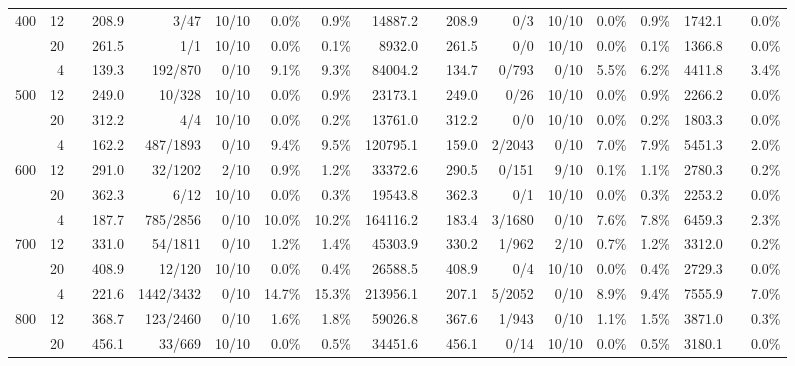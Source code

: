 \documentclass[11pt,a4paper]{article}
\newcommand{\ccg}{\cellcolor{lightgray}}
\begin{document}
\begin{sidewaystable}
{\begin{tabular}{rr r rrrrr r rrrrrrrrr}
400  & 12 &&  \ccg208.9 & 3/47	  &    10/10  & 0.0\%  & 0.9\%  & 14887.2    &&	  \ccg208.9 & 0/3  	 & 10/10 &  0.0\%  & 0.9\%  & 1742.1 && 0.0\% \\
     & 20 &&  \ccg261.5 & 1/1	  &    10/10  & 0.0\%  & 0.1\%  & 8932.0     &&	  \ccg261.5 & 0/0  	 & 10/10 &  0.0\%  & 0.1\%  & 1366.8 && 0.0\% \\ \hline
     & 4  &&  139.3 & 192/870	  &    0/10   & 9.1\%  & 9.3\%  & 84004.2    &&	  \ccg134.7 & 0/793	 & 0/10  &  5.5\%  & 6.2\%  & 4411.8 && 3.4\% \\
500  & 12 &&  \ccg249.0 & 10/328  &   10/10   & 0.0\%  & 0.9\%  & 23173.1    &&	  \ccg249.0 & 0/26 	 & 10/10 &  0.0\%  & 0.9\%  & 2266.2 && 0.0\% \\
     & 20 &&  \ccg312.2 & 4/4	  &    10/10  & 0.0\%  & 0.2\%  & 13761.0    &&	  \ccg312.2 & 0/0  	 & 10/10 &  0.0\%  & 0.2\%  & 1803.3 && 0.0\% \\ \hline
     & 4  &&  162.2 & 487/1893	  &    0/10   & 9.4\%  & 9.5\%  & 120795.1   &&	  \ccg159.0 & 2/2043	 & 0/10  &  7.0\%  & 7.9\%  & 5451.3 && 2.0\% \\
600  & 12 &&  291.0 & 32/1202	  &    2/10   & 0.9\%  & 1.2\%  & 33372.6    &&	  \ccg290.5 & 0/151	 & 9/10  &  0.1\%  & 1.1\%  & 2780.3 && 0.2\% \\
     & 20 &&  \ccg362.3 & 6/12	  &    10/10  & 0.0\%  & 0.3\%  & 19543.8    &&	  \ccg362.3 & 0/1  	 & 10/10 &  0.0\%  & 0.3\%  & 2253.2 && 0.0\% \\ \hline
     & 4  &&  187.7 & 785/2856    &    0/10   & 10.0\% & 10.2\% & 164116.2   &&	  \ccg183.4 & 3/1680	 & 0/10  &  7.6\%  & 7.8\%  & 6459.3 && 2.3\% \\
700  & 12 &&  331.0 & 54/1811	  &    0/10   & 1.2\%  & 1.4\%  & 45303.9    &&	  \ccg330.2 & 1/962	 & 2/10  &  0.7\%  & 1.2\%  & 3312.0 && 0.2\% \\
     & 20 &&  \ccg408.9 & 12/120  &    10/10  & 0.0\%  & 0.4\%  & 26588.5    &&	 \ccg408.9  & 0/4        & 10/10 &  0.0\%  & 0.4\%  & 2729.3 && 0.0\% \\ \hline
     & 4  &&  221.6 & 1442/3432   &    0/10   & 14.7\% & 15.3\% & 213956.1   &&	  \ccg207.1 & 5/2052	 & 0/10  &  8.9\%  & 9.4\%  & 7555.9 && 7.0\% \\
800  & 12 &&  368.7 & 123/2460	  &    0/10   & 1.6\%  & 1.8\%  & 59026.8    &&	  \ccg367.6 & 1/943	 & 0/10  &  1.1\%  & 1.5\%  & 3871.0 && 0.3\% \\
     & 20 &&  \ccg456.1 & 33/669  &    10/10  & 0.0\%  & 0.5\%  & 34451.6    &&	\ccg456.1   & 0/14       & 10/10 &  0.0\%  & 0.5\%  & 3180.1 && 0.0\% \\ \hline

\end{tabular}}
\end{sidewaystable}
\end{document}
